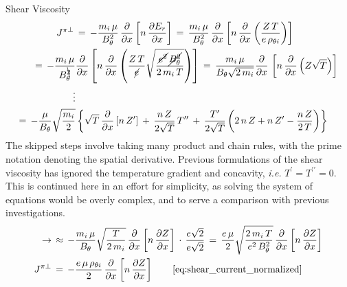Shear Viscosity
\begin{align} %
	J^{\pi\perp} \,&=\, -\frac{m_i \, \mu}{B_\theta^2} \,
		\frac{\partial}{\partial x} \left[n \, \frac{\partial E_r}
		{\partial x}\right]
		\,=\, \frac{m_i \, \mu}{B_\theta^2} \, \frac{\partial}{\partial x}
		\left[n \, \frac{\partial}{\partial x} \left(\frac{Z \, T}
		{e \, \rho_{\theta i}}\right)\right] \\
	=\, -\frac{m_i \, \mu}{B_\theta^{\bcancel{2}}} &\frac{\partial}{\partial x}
		\left[n \, \frac{\partial}{\partial x}\left(\frac{Z \, T}{\cancel{e}}
		\sqrt{\frac{\cancel{e^2} \, \cancel{B_\theta^{2}}}{2 \, m_i \, T}}
		\right)\right]
		\,=\, \frac{m_i \, \mu}{B_\theta \sqrt{2 \, m_i}}
		\frac{\partial}{\partial x} \, \left[n \, \frac{\partial}{\partial x}
		\left(Z \sqrt{T}\right)\right] \\
	\nonumber\vdots \\
	=\, -\frac{\mu}{B_\theta} \sqrt{\frac{m_i}{2}} &\left\{\sqrt{T} \,
		\frac{\partial}{\partial x} \left[n \, Z^\prime\right] \,+\,
		\frac{n \, Z}{2\sqrt{T}} \, T^{\prime\prime} \,+\,
		\frac{T^\prime}{2\sqrt{T}} \left(2 \, n \, Z + n \, Z^\prime -
		\frac{n \, Z}{2 \, T}\right)\right\}
\end{align}
The skipped steps involve taking many product and chain rules, with the prime notation denoting the spatial derivative.
Previous formulations of the shear viscosity has ignored the temperature gradient and concavity, \emph{i.e.} $T^\prime = T^{\prime\prime} = 0$.
This is continued here in an effort for simplicity, as solving the system of equations would be overly complex, and to serve a comparison with previous investigations.
\begin{align} %
	\rightarrow\, &\approx\, -\frac{m_i \, \mu}{B_\theta}
		\sqrt{\frac{T}{2 \, m_i}} \, \frac{\partial}{\partial x} \left[n \,
		\frac{\partial Z}{\partial x} \right] \,\cdot\,
		\frac{e\sqrt{2}}{e\sqrt{2}}
		\,=\, \frac{e \, \mu}{2} \sqrt{\frac{2 \, m_i \, T}{e^2 \, B_\theta^2}}
		\, \frac{\partial}{\partial x} \left[n \, \frac{\partial Z}{\partial x}
		\right] \\
	J^{\pi\perp} \,&=\, -\frac{e \, \mu \, \rho_{\theta i}}{2} \,
		\frac{\partial}{\partial x} \left[n \, \frac{\partial Z}
		{\partial x}\right] \tag*{\eqref{eq:shear_current_normalized}}
\end{align}

